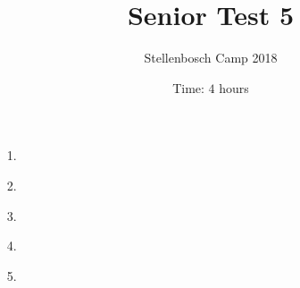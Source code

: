 \documentclass[a4paper, 12pt]{article}
\title{Senior Test 5}
\author{Stellenbosch Camp 2018}
\date{Time: $4$ hours}
\begin{document}
 \maketitle

\begin{enumerate}

% 
\item[1.]  


\vspace{6pt}

% 
\item[2.] 


\vspace{6pt}

% 
\item[3.] 


\vspace{6pt}

% 
\item[4.] 


\vspace{6pt}

% 
\item[5.] 


\end{enumerate}

\vfill

\centering
\begin{BVerbatim}
\end{BVerbatim}
\end{document}
